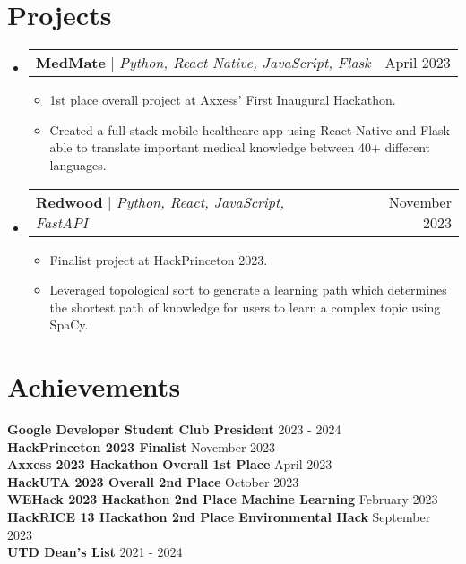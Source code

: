 \documentclass[11pt,letterpaper]{article}%
\makeatletter
\newcommand{\resumeItem}[1]{
  \item\small{
    {#1 \vspace{-2pt}}
  }
}
\newcommand{\resumeProjectHeading}[2]{
    \item
    \begin{tabular*}{0.97\textwidth}{l@{\extracolsep{\fill}}r}
      \small#1 & #2 \\
    \end{tabular*}\vspace{-7pt}
}
\newcommand{\resumeSubHeadingListStart}{\begin{itemize}[leftmargin=0.15in, label={}]}
\newcommand{\resumeSubHeadingListEnd}{\end{itemize}}
\newcommand{\resumeItemListStart}{\begin{itemize}}
\newcommand{\resumeItemListEnd}{\end{itemize}\vspace{-5pt}}
\makeatother
\begin{document}
\section{Projects}
%
    \resumeSubHeadingListStart
%
      \resumeProjectHeading
%
          {\textbf{MedMate} $|$ \emph{Python, React Native, JavaScript, Flask}}{April 2023}
%
          \resumeItemListStart
%
            \resumeItem{1st place overall project at Axxess' First Inaugural Hackathon.}
%
            \resumeItem{Created a full stack mobile healthcare app using React Native and Flask able to translate important medical knowledge between 40+ different languages.}
%
          \resumeItemListEnd
%
      \resumeProjectHeading
%
          {\textbf{Redwood} $|$ \emph{Python, React, JavaScript, FastAPI}}{November 2023}
%
          \resumeItemListStart
%
            \resumeItem{Finalist project at HackPrinceton 2023.}
%
            \resumeItem{Leveraged topological sort to generate a learning path which determines the shortest path of knowledge for users to learn a complex topic using SpaCy.}
%
          \resumeItemListEnd
%
    \resumeSubHeadingListEnd
%
%
\section{Achievements}
%
 \begin{itemize}[leftmargin=0.15in, label={}]
%
    \small{\item{
    
        \textbf{Google Developer Student Club President} \hfill {2023 {-} 2024} \\
%
     \textbf{HackPrinceton 2023 Finalist} \hfill {November 2023} \\
%
     \textbf{Axxess 2023 Hackathon Overall 1st Place} \hfill {April 2023} \\
%
     \textbf{HackUTA 2023 Overall 2nd Place} \hfill {October 2023} \\
%
     \textbf{WEHack 2023 Hackathon 2nd Place Machine Learning} \hfill {February 2023} \\
%
     \textbf{HackRICE 13 Hackathon 2nd Place Environmental Hack} \hfill {September 2023} \\
%
     \textbf{UTD Dean's List} \hfill {2021 {-} 2024} \\
%
    }}
%
 \end{itemize}
%

%
\end{document}
